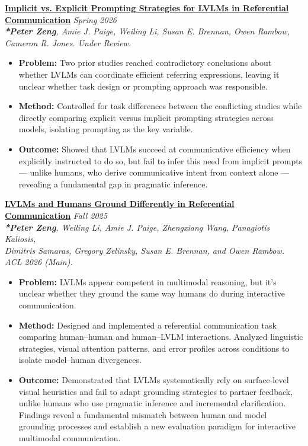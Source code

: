 \documentclass[letterpaper,10pt]{article}
\newcommand{\organization}[4]{
    \vspace{-1.0pt}
    \textbf{#1} \hfill{\emph{#2}} \\
    \emph{#3} \hfill{#4} \\
    \vspace{1.5pt} %
}
\newcommand{\bulletsBegin}{
    \vspace{1pt}
    \begin{minipage}{17.6cm} 
    \begin{itemize}[leftmargin=0.6cm]
    \setlength\itemsep{1pt} %
}
\newcommand{\bulletsEnd}{
    \end{itemize}\vspace{1pt}
    \end{minipage}
}
\begin{document}
    \organization{\href{https://arxiv.org/pdf/2606.17372}{Implicit vs. Explicit Prompting Strategies for LVLMs in Referential Communication}}{Spring 2026}
    {\textbf{*Peter Zeng}, Amie J. Paige, Weiling Li, Susan E. Brennan, Owen Rambow, Cameron R. Jones. \textit{Under Review}.}{}
    \bulletsBegin
        \item \textbf{Problem:} Two prior studies reached contradictory conclusions about whether LVLMs can coordinate efficient referring expressions, leaving it unclear whether task design or prompting approach was responsible.
        \item \textbf{Method:} Controlled for task differences between the conflicting studies while directly comparing explicit versus implicit prompting strategies across models, isolating prompting as the key variable.
        \item \textbf{Outcome:} Showed that LVLMs succeed at communicative efficiency when explicitly instructed to do so, but fail to infer this need from implicit prompts — unlike humans, who derive communicative intent from context alone — revealing a fundamental gap in pragmatic inference.
    \bulletsEnd

    \organization{\href{https://arxiv.org/abs/2601.19792v2}{LVLMs and Humans Ground Differently in Referential Communication}}{Fall 2025}
    {\textbf{*Peter Zeng}, Weiling Li, Amie J. Paige, Zhengxiang Wang, Panagiotis Kaliosis, \\ Dimitris Samaras, Gregory Zelinsky, Susan E. Brennan, and Owen Rambow. \textit{ACL 2026 (Main)}.}{}
    \bulletsBegin
        \item \textbf{Problem:} LVLMs appear competent in multimodal reasoning, but it's unclear whether they ground the same way humans do during interactive communication.
        \item \textbf{Method:} Designed and implemented a referential communication task comparing human–human and human–LVLM interactions. Analyzed linguistic strategies, visual attention patterns, and error profiles across conditions to isolate model–human divergences.
        \item \textbf{Outcome:} Demonstrated that LVLMs systematically rely on surface‑level visual heuristics and fail to adapt grounding strategies to partner feedback, unlike humans who use pragmatic inference and incremental clarification. Findings reveal a fundamental mismatch between human and model grounding processes and establish a new evaluation paradigm for interactive multimodal communication.
    \bulletsEnd
    
\end{document}
